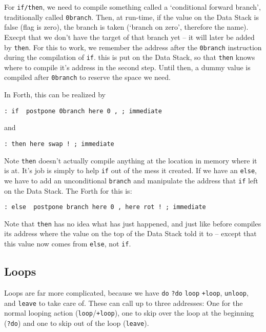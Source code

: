 For \texttt{if/then}, we need to compile something called a `conditional forward
branch', traditionally called \texttt{0branch}. Then, at run-time, if the value
on the Data Stack is false (flag is zero), the branch is taken (`branch on
zero', therefore the name). Execpt that we don't have the target of that branch
yet -- it will later be added by \texttt{then}. For this to work, we remember
the address after the \texttt{0branch} instruction during the compilation of
\texttt{if}. this is put on the Data Stack, so that \texttt{then} knows where to
compile it's address in the second step.  Until then, a dummy value is compiled
after \texttt{0branch} to reserve the space we need. 

In Forth, this can be realized by

\begin{lstlisting}[frame=single]
        : if  postpone 0branch here 0 , ; immediate
\end{lstlisting}

and 

\begin{lstlisting}[frame=single]
        : then here swap ! ; immediate
\end{lstlisting}

Note \texttt{then} doesn't actually compile anything at the location in memory
where it is at. It's job is simply to help \texttt{if} out of the mess it
created.  If we have an \texttt{else}, we have to add an unconditional
\texttt{branch} and manipulate the address that \texttt{if} left on the Data
Stack. The Forth for this is: 

\begin{lstlisting}[frame=single]
        : else  postpone branch here 0 , here rot ! ; immediate
\end{lstlisting}

Note that \texttt{then} has no idea what has just happened, and just like before
compiles its address where the value on the top of the Data Stack told it to --
except that this value now comes from \texttt{else}, not \texttt{if}. 


\subsection{Loops} 

Loops are far more complicated, because we have \texttt{do} \texttt{?do}
\texttt{loop} \texttt{+loop}, \texttt{unloop}, and \texttt{leave} to take care
of. These can call up to three addresses: One for the normal looping action
(\texttt{loop}/\texttt{+loop}), one to skip over the loop at the beginning
(\texttt{?do}) and one to skip out of the loop (\texttt{leave}). 

